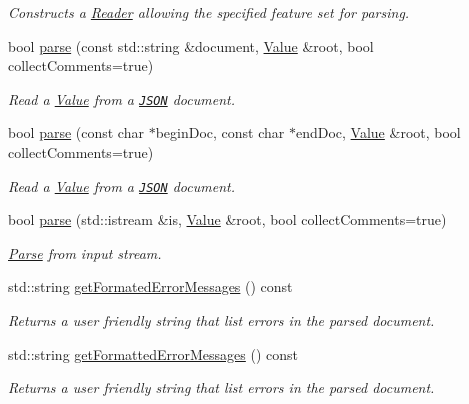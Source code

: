 \begin{DoxyCompactItemize}
\begin{DoxyCompactList}\small\item\em Constructs a \hyperlink{class_json_1_1_reader}{Reader} allowing the specified feature set for parsing. \end{DoxyCompactList}\item 
bool \hyperlink{class_json_1_1_reader_af1da6c976ad1e96c742804c3853eef94}{parse} (const std\-::string \&document, \hyperlink{class_json_1_1_value}{Value} \&root, bool collect\-Comments=true)
\begin{DoxyCompactList}\small\item\em Read a \hyperlink{class_json_1_1_value}{Value} from a \href{http://www.json.org}{\tt J\-S\-O\-N} document. \end{DoxyCompactList}\item 
bool \hyperlink{class_json_1_1_reader_ac71ef2b64c7c27b062052e692af3fb32}{parse} (const char $\ast$begin\-Doc, const char $\ast$end\-Doc, \hyperlink{class_json_1_1_value}{Value} \&root, bool collect\-Comments=true)
\begin{DoxyCompactList}\small\item\em Read a \hyperlink{class_json_1_1_value}{Value} from a \href{http://www.json.org}{\tt J\-S\-O\-N} document. \end{DoxyCompactList}\item 
bool \hyperlink{class_json_1_1_reader_a8d0347e6b47343e4bc68be7ecdb9c4e9}{parse} (std\-::istream \&is, \hyperlink{class_json_1_1_value}{Value} \&root, bool collect\-Comments=true)
\begin{DoxyCompactList}\small\item\em \hyperlink{struct_parse}{Parse} from input stream. \end{DoxyCompactList}\item 
std\-::string \hyperlink{class_json_1_1_reader_afa4a59e962d23c4d1c38b433fc95eefa}{get\-Formated\-Error\-Messages} () const 
\begin{DoxyCompactList}\small\item\em Returns a user friendly string that list errors in the parsed document. \end{DoxyCompactList}\item 
std\-::string \hyperlink{class_json_1_1_reader_a95ab50aa789132e9dee0fc1475c85acf}{get\-Formatted\-Error\-Messages} () const 
\begin{DoxyCompactList}\small\item\em Returns a user friendly string that list errors in the parsed document. \end{DoxyCompactList}\end{DoxyCompactItemize}


